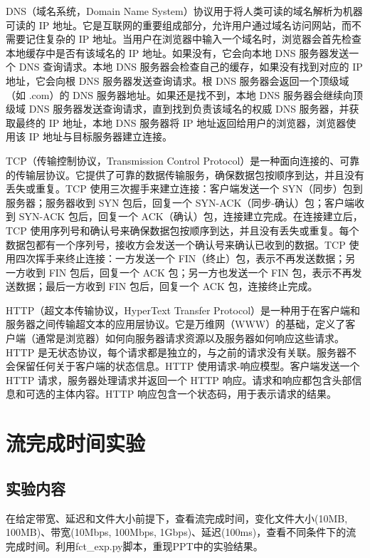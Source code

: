 \documentclass[UTF8]{article}
\begin{document}
DNS（域名系统，Domain Name System）协议用于将人类可读的域名解析为机器可读的 IP 地址。它是互联网的重要组成部分，允许用户通过域名访问网站，而不需要记住复杂的 IP 地址。当用户在浏览器中输入一个域名时，浏览器会首先检查本地缓存中是否有该域名的 IP 地址。如果没有，它会向本地 DNS 服务器发送一个 DNS 查询请求。本地 DNS 服务器会检查自己的缓存，如果没有找到对应的 IP 地址，它会向根 DNS 服务器发送查询请求。根 DNS 服务器会返回一个顶级域（如 .com）的 DNS 服务器地址。如果还是找不到，本地 DNS 服务器会继续向顶级域 DNS 服务器发送查询请求，直到找到负责该域名的权威 DNS 服务器，并获取最终的 IP 地址，本地 DNS 服务器将 IP 地址返回给用户的浏览器，浏览器使用该 IP 地址与目标服务器建立连接。

TCP（传输控制协议，Transmission Control Protocol）是一种面向连接的、可靠的传输层协议。它提供了可靠的数据传输服务，确保数据包按顺序到达，并且没有丢失或重复。TCP 使用三次握手来建立连接：客户端发送一个 SYN（同步）包到服务器；服务器收到 SYN 包后，回复一个 SYN-ACK（同步-确认）包；客户端收到 SYN-ACK 包后，回复一个 ACK（确认）包，连接建立完成。在连接建立后，TCP 使用序列号和确认号来确保数据包按顺序到达，并且没有丢失或重复。每个数据包都有一个序列号，接收方会发送一个确认号来确认已收到的数据。TCP 使用四次挥手来终止连接：一方发送一个 FIN（终止）包，表示不再发送数据；另一方收到 FIN 包后，回复一个 ACK 包；另一方也发送一个 FIN 包，表示不再发送数据；最后一方收到 FIN 包后，回复一个 ACK 包，连接终止完成。


HTTP（超文本传输协议，HyperText Transfer Protocol）是一种用于在客户端和服务器之间传输超文本的应用层协议。它是万维网（WWW）的基础，定义了客户端（通常是浏览器）如何向服务器请求资源以及服务器如何响应这些请求。HTTP 是无状态协议，每个请求都是独立的，与之前的请求没有关联。服务器不会保留任何关于客户端的状态信息。HTTP 使用请求-响应模型。客户端发送一个 HTTP 请求，服务器处理请求并返回一个 HTTP 响应。请求和响应都包含头部信息和可选的主体内容。HTTP 响应包含一个状态码，用于表示请求的结果。

\section{流完成时间实验}

\subsection{实验内容}

在给定带宽、延迟和文件大小前提下，查看流完成时间，变化文件大小(10MB, 100MB)、带宽(10Mbps, 100Mbps, 1Gbps)、延迟(100ms)，查看不同条件下的流完成时间。利用fct_exp.py脚本，重现PPT中的实验结果。
\end{document}
